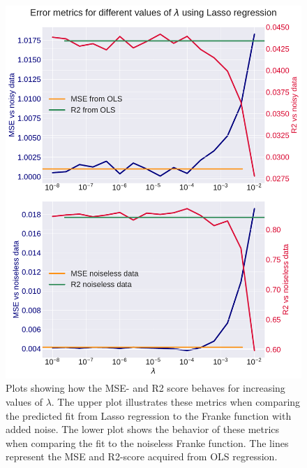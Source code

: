 \documentclass[10pt, twocolumn]{article}
\begin{document}
\begin{figure}[h!]
    \centering
    \includegraphics[scale=0.4]{../figs/errormetrics_lambda_lasso_franke.pdf}
    \caption{Plots showing how the MSE- and R2 score behaves for increasing values of $\lambda$. The upper plot illustrates these metrics when comparing the predicted fit from Lasso regression to the Franke function with added noise. The lower plot shows the behavior of these metrics when comparing the fit to the noiseless Franke function. The lines represent the MSE and R2-score acquired from OLS regression.}
    \label{fig:lambda_lasso_franke}
\end{figure}
\end{document}
